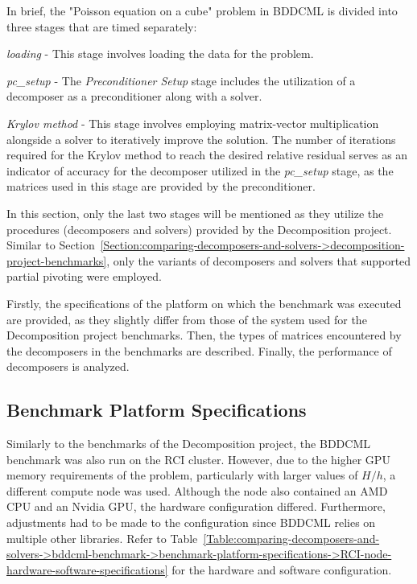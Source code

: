 In brief, the "Poisson equation on a cube" problem in BDDCML is divided into three stages that are timed separately\label{Text:comparing-decomposers-and-solvers->bddcml-benchmark->poisson-on-cube-stages}:

\begin{tight_enumerate}
	\item \textit{loading} - This stage involves loading the data for the problem.
	\item \textit{pc\_setup} - The \textit{Preconditioner Setup} stage includes the utilization of a decomposer as a preconditioner along with a solver.
	\item \textit{Krylov method} - This stage involves employing matrix-vector multiplication alongside a solver to iteratively improve the solution.
The number of iterations required for the Krylov method to reach the desired relative residual serves as an indicator of accuracy for the decomposer utilized in the \textit{pc\_setup} stage, as the matrices used in this stage are provided by the preconditioner.
\end{tight_enumerate}

In this section, only the last two stages will be mentioned as they utilize the procedures (decomposers and solvers) provided by the Decomposition project.
Similar to Section~\ref{Section:comparing-decomposers-and-solvers->decomposition-project-benchmarks}, only the variants of decomposers and solvers that supported partial pivoting were employed.

Firstly, the specifications of the platform on which the benchmark was executed are provided, as they slightly differ from those of the system used for the Decomposition project benchmarks.
Then, the types of matrices encountered by the decomposers in the benchmarks are described.
Finally, the performance of decomposers is analyzed.

\subsection{Benchmark Platform Specifications}\label{Subsection:comparing-decomposers-and-solvers->bddcml-benchmark->benchmark-platform-specifications}
Similarly to the benchmarks of the Decomposition project, the BDDCML benchmark was also run on the RCI cluster.
However, due to the higher GPU memory requirements of the problem, particularly with larger values of $H/h$, a different compute node was used.
Although the node also contained an AMD CPU and an Nvidia GPU, the hardware configuration differed.
Furthermore, adjustments had to be made to the configuration since BDDCML relies on multiple other libraries.
Refer to Table~\ref{Table:comparing-decomposers-and-solvers->bddcml-benchmark->benchmark-platform-specifications->RCI-node-hardware-software-specifications} for the hardware and software configuration.

